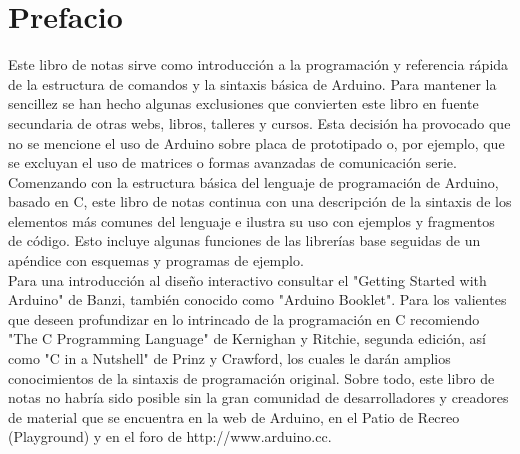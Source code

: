 \chapter{Prefacio}
Este libro de notas sirve como introducción a la programación y referencia rápida de la estructura de comandos y la sintaxis básica de Arduino. Para mantener la sencillez se han hecho algunas exclusiones que convierten este libro en fuente secundaria de otras webs, libros, talleres y cursos. Esta decisión ha provocado que no se mencione el uso de Arduino sobre placa de prototipado o, por ejemplo, que se excluyan el uso de matrices o formas avanzadas de comunicación serie.\\
Comenzando con la estructura básica del lenguaje de programación de Arduino, basado en C, este libro de notas continua con una descripción de la sintaxis de los elementos más comunes del lenguaje e ilustra su uso con ejemplos y fragmentos de código. Esto incluye algunas funciones de las librerías base seguidas de un apéndice con esquemas y programas de ejemplo.\\
Para una introducción al diseño interactivo consultar el "Getting Started with Arduino" de Banzi, también conocido como "Arduino Booklet". Para los valientes que deseen profundizar en lo intrincado de la programación en C recomiendo "The C Programming Language" de Kernighan y Ritchie, segunda edición, así como "C in a Nutshell" de Prinz y Crawford, los cuales le darán amplios conocimientos de la sintaxis de programación original.
Sobre todo, este libro de notas no habría sido posible sin la gran comunidad de desarrolladores y creadores de material que se encuentra en la web de Arduino, en el Patio de Recreo (Playground) y en el foro de http://www.arduino.cc.
